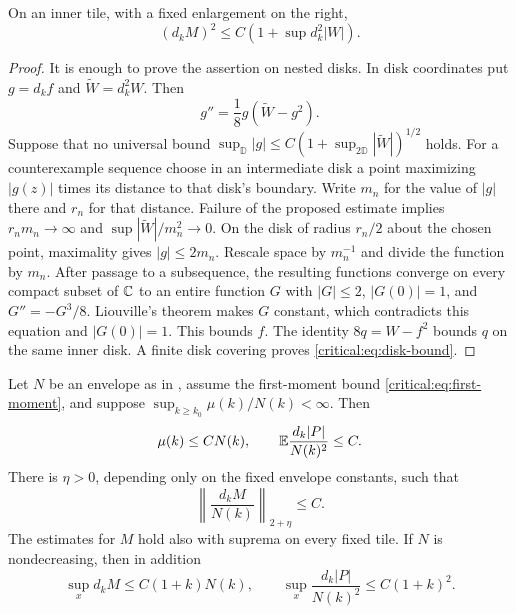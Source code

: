 \begin{lemma}\label{critical:lem:disk-bound}
On an inner tile, with a fixed enlargement on the right,
\begin{equation}\label{critical:eq:disk-bound}
 (d_kM)^2\le C\left(1+\sup d_k^2|W|\right).
\end{equation}
\end{lemma}

\begin{proof}
It is enough to prove the assertion on nested disks. In disk
coordinates put \(g=d_kf\) and \(\widetilde W=d_k^2W\). Then
\[
 g''=\frac18g(\widetilde W-g^2).
\]
Suppose that no universal bound
\(\sup_{\mathbb D}|g|\le C(1+\sup_{2\mathbb D}|\widetilde W|)^{1/2}\)
holds. For a counterexample sequence choose in an intermediate disk a
point maximizing \(|g(z)|\) times its distance to that disk's boundary.
Write \(m_n\) for the value of \(|g|\) there and \(r_n\) for that
distance. Failure of the proposed estimate implies
\(r_nm_n\to\infty\) and
\(\sup|\widetilde W|/m_n^2\to0\). On the disk of radius \(r_n/2\)
about the chosen point, maximality gives \(|g|\le2m_n\).
Rescale space by \(m_n^{-1}\) and divide the function by \(m_n\).
After passage to a subsequence, the resulting functions converge on
every compact subset of \(\mathbb C\) to an entire function \(G\) with
\(|G|\le2\), \(|G(0)|=1\), and
\(G''=-G^3/8\). Liouville's theorem makes \(G\) constant, which
contradicts this equation and \(|G(0)|=1\). This bounds \(f\).
The identity \(8q=W-f^2\) bounds \(q\) on the same inner disk.
A finite disk covering proves \eqref{critical:eq:disk-bound}.
\end{proof}

\begin{theorem}\label{thm:critical-bootstrap}
Let \(N\) be an envelope as in , assume
the first-moment bound \eqref{critical:eq:first-moment}, and suppose
\(\sup_{k\ge k_0}\mu(k)/N(k)<\infty\). Then
\begin{equation}\label{critical:eq:L2-bootstrap}
 \mu(k)\le C N(k),\qquad
 \mathbb E\frac{d_k|P|}{N(k)^2}\le C.
\end{equation}
There is \(\eta>0\), depending only on the fixed envelope constants,
such that
\begin{equation}\label{critical:eq:higher-moment}
 \left\|\frac{d_kM}{N(k)}\right\|_{2+\eta}\le C.
\end{equation}
The estimates for \(M\) hold also with suprema on every fixed tile.
If \(N\) is nondecreasing, then in addition
\begin{equation}\label{critical:eq:global-envelope}
 \sup_x d_kM\le C(1+k)N(k),\qquad
 \sup_x\frac{d_k|P|}{N(k)^2}\le C(1+k)^2.
\end{equation}
\end{theorem}

